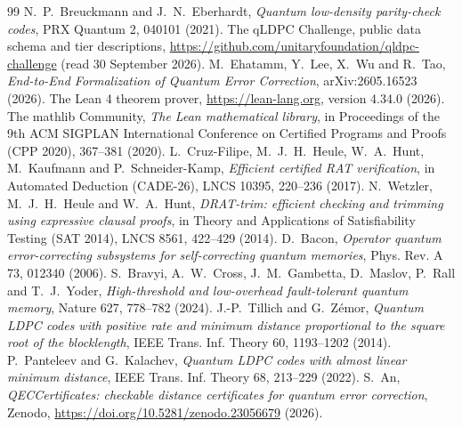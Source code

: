 \documentclass[11pt]{article}
\begin{document}
\begin{thebibliography}{99}
 N.~P.~Breuckmann and J.~N.~Eberhardt, \emph{Quantum
low-density parity-check codes}, PRX Quantum 2, 040101 (2021).
 The qLDPC Challenge, public data schema and tier descriptions,
\url{https://github.com/unitaryfoundation/qldpc-challenge} (read 30 September 2026).
 M.~Ehatamm, Y.~Lee, X.~Wu and R.~Tao, \emph{End-to-End
Formalization of Quantum Error Correction}, arXiv:2605.16523 (2026).
 The Lean 4 theorem prover, \url{https://lean-lang.org},
version 4.34.0 (2026).
 The mathlib Community, \emph{The Lean mathematical library}, in
Proceedings of the 9th ACM SIGPLAN International Conference on Certified Programs and
Proofs (CPP 2020), 367--381 (2020).
 L.~Cruz-Filipe, M.~J.~H.~Heule, W.~A.~Hunt, M.~Kaufmann and
P.~Schneider-Kamp, \emph{Efficient certified RAT verification}, in Automated
Deduction (CADE-26), LNCS 10395, 220--236 (2017).
 N.~Wetzler, M.~J.~H.~Heule and W.~A.~Hunt,
\emph{DRAT-trim: efficient checking and trimming using expressive clausal proofs},
in Theory and Applications of Satisfiability Testing (SAT 2014), LNCS 8561,
422--429 (2014).
 D.~Bacon, \emph{Operator quantum error-correcting subsystems
for self-correcting quantum memories}, Phys. Rev. A 73, 012340 (2006).
 S.~Bravyi, A.~W.~Cross, J.~M.~Gambetta, D.~Maslov, P.~Rall
and T.~J.~Yoder, \emph{High-threshold and low-overhead fault-tolerant quantum
memory}, Nature 627, 778--782 (2024).
 J.-P.~Tillich and G.~Z{\'e}mor, \emph{Quantum LDPC codes
with positive rate and minimum distance proportional to the square root of the
blocklength}, IEEE Trans. Inf. Theory 60, 1193--1202 (2014).
 P.~Panteleev and G.~Kalachev, \emph{Quantum LDPC codes
with almost linear minimum distance}, IEEE Trans. Inf. Theory 68, 213--229 (2022).
 S.~An, \emph{QECCertificates: checkable distance
certificates for quantum error correction}, Zenodo,
\url{https://doi.org/10.5281/zenodo.23056679} (2026).
\end{thebibliography}
\end{document}

